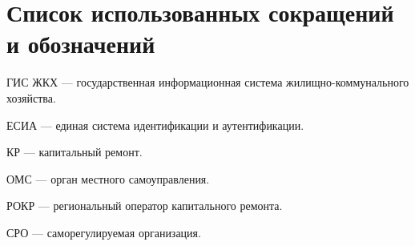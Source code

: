 \section*{Список использованных сокращений и обозначений}

ГИС ЖКХ --- государственная информационная система жи\-лищ\-но-ком\-му\-наль\-ного хозяйства.

ЕСИА --- единая система идентификации и аутентификации.

КР --- капитальный ремонт.

ОМС --- орган местного самоуправления.

РОКР --- региональный оператор капитального ремонта.

СРО --- саморегулируемая организация.

\clearpage
\newpage